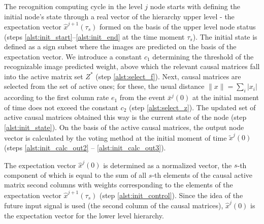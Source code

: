 \documentclass[review]{elsarticle}
\begin{document}
The recognition computing cycle in the level $j$ node starts with defining the initial node’s state through a real vector of the hierarchy upper level - the expectation vector $\hat x^{j+1}(\tau_s)$ formed on the basis of the upper level node status (steps \ref{alst:init_start}--\ref{alst:init_end} at the time moment $\tau_s$). The initial state is defined as a sign subset where the images are predicted on the basis of the expectation vector. We introduce a constant $c_1$ determining the threshold of the recognizable image predicted weight, above which the relevant causal matrices fall into the active matrix set $Z^*$ (step \ref{alst:select_f}). Next, causal matrices are selected from the set of active ones; for these, the usual distance $\|x\|=\sum_i |x_i|$ according to the first column rate $e_1$ from the event $\bar x^j(0)$ at the initial moment of time does not exceed the constant $c_2$ (step \ref{alst:select_z}). The updated set of active causal matrices obtained this way is the current state of the node (step \ref{alst:init_state}). On the basis of the active causal matrices, the output node vector is calculated by the voting method at the initial moment of time $\tilde x^j(0)$ (steps \ref{alst:init_calc_out2} -- \ref{alst:init_calc_out3}).

\linespread{1}
\begin{algorithm}[H]
	\label{alg:automato}
	\begin{algorithmic}[1]
		
	\end{algorithmic}
\end{algorithm}
\linespread{2}

The expectation vector $\hat x^j(0)$ is determined as a normalized vector, the $s$-th component of which is equal to the sum of all $s$-th elements of the causal active matrix second columns with weights corresponding to the elements of the expectation vector $\hat x^{j+1}(\tau_s)$ (step \ref{alst:init_control}). Since the idea of the future input signal is used (the second column of the causal matrices), $\hat x^j(0)$ is the expectation vector for the lower level hierarchy.

\linespread{1}
\begin{algorithm}[H]
	\begin{algorithmic}[1]
		\algrestore{algst:store1}
		
	\end{algorithmic}
\end{algorithm}
\linespread{2}
\end{document}
